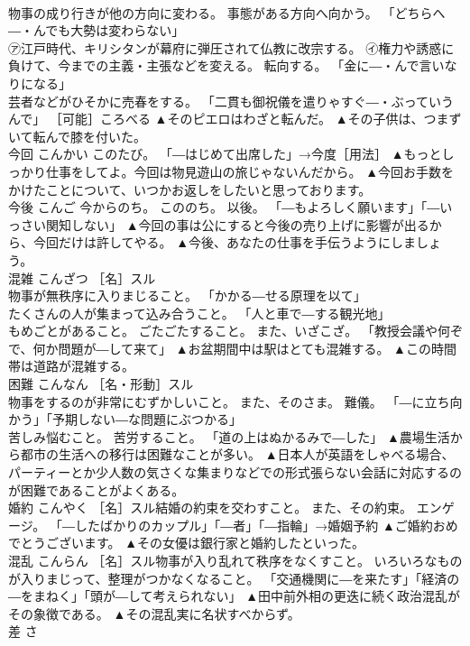 \documentclass[8pt]{extreport}
\begin{document}
\begin{CJK}{UTF8}{min}
\\	物事の成り行きが他の方向に変わる。 事態がある方向へ向かう。 「どちらへ―・んでも大勢は変わらない」 
\\	㋐江戸時代、キリシタンが幕府に弾圧されて仏教に改宗する。 ㋑権力や誘惑に負けて、今までの主義・主張などを変える。 転向する。 「金に―・んで言いなりになる」 
\\	芸者などがひそかに売春をする。 「二貫も御祝儀を遣りゃすぐ―・ぶっていうんで」 ［可能］ころべる	▲そのピエロはわざと転んだ。 ▲その子供は、つまずいて転んで膝を付いた。
\\	今回	こんかい	このたび。 「―はじめて出席した」→今度［用法］	▲もっとしっかり仕事をしてよ。今回は物見遊山の旅じゃないんだから。 ▲今回お手数をかけたことについて、いつかお返しをしたいと思っております。
\\	今後	こんご	今からのち。 こののち。 以後。 「―もよろしく願います」「―いっさい関知しない」	▲今回の事は公にすると今後の売り上げに影響が出るから、今回だけは許してやる。 ▲今後、あなたの仕事を手伝うようにしましょう。
\\	混雑	こんざつ	［名］スル 
\\	物事が無秩序に入りまじること。 「かかる―せる原理を以て」 
\\	たくさんの人が集まって込み合うこと。 「人と車で―する観光地」 
\\	もめごとがあること。 ごたごたすること。 また、いざこざ。 「教授会議や何ぞで、何か問題が―して来て」	▲お盆期間中は駅はとても混雑する。 ▲この時間帯は道路が混雑する。
\\	困難	こんなん	［名・形動］スル 
\\	物事をするのが非常にむずかしいこと。 また、そのさま。 難儀。 「―に立ち向かう」「予期しない―な問題にぶつかる」 
\\	苦しみ悩むこと。 苦労すること。 「道の上はぬかるみで―した」	▲農場生活から都市の生活への移行は困難なことが多い。 ▲日本人が英語をしゃべる場合、パーティーとか少人数の気さくな集まりなどでの形式張らない会話に対応するのが困難であることがよくある。
\\	婚約	こんやく	［名］スル結婚の約束を交わすこと。 また、その約束。 エンゲージ。 「―したばかりのカップル」「―者」「―指輪」→婚姻予約	▲ご婚約おめでとうございます。 ▲その女優は銀行家と婚約したといった。
\\	混乱	こんらん	［名］スル物事が入り乱れて秩序をなくすこと。 いろいろなものが入りまじって、整理がつかなくなること。 「交通機関に―を来たす」「経済の―をまねく」「頭が―して考えられない」	▲田中前外相の更迭に続く政治混乱がその象徴である。 ▲その混乱実に名状すべからず。
\\	差	さ	

\end{CJK}
\end{document}
